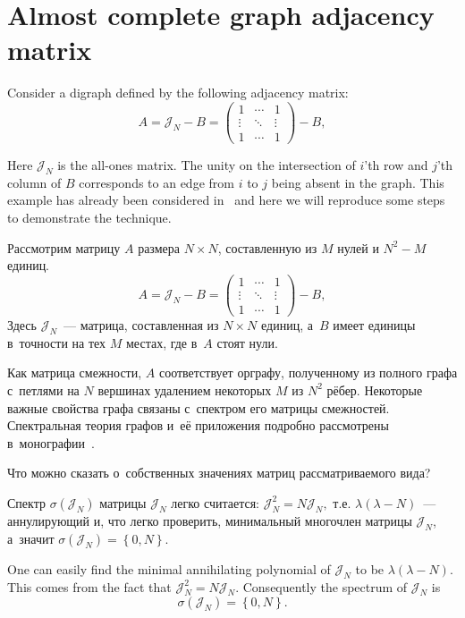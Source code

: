 \documentclass[14pt,a4paper]{extarticle}
\theoremstyle{definition}
\begin{document}
\section{Almost complete graph adjacency matrix}
\sloppy
Consider a digraph defined by the following adjacency matrix:
\[
    A = \mathcal{J}_N - B = \begin{pmatrix}1 & \cdots & 1 \\ \vdots & \ddots & \vdots \\ 1 & \cdots & 1\end{pmatrix} - B,
\]

Here \( \mathcal{J}_N \) is the all-ones matrix.
The unity on the intersection
of \( i \)'th row and \( j \)'th column of \( B \)
corresponds to an edge from \( i \) to \( j \)
being absent in the graph.
This example has already been considered in~\cite{sergekozlukov@volgograd}
and here we will reproduce some steps to demonstrate the technique.

Рассмотрим матрицу \( A \) размера \( N\times N \),
 составленную из \( M \) нулей и \( N^2 - M \) единиц.
\[
    A = \mathcal{J}_N - B = \begin{pmatrix}1 & \cdots & 1 \\ \vdots & \ddots & \vdots \\ 1 & \cdots & 1\end{pmatrix} - B,
\]
Здесь \( \mathcal{J}_N \)~--- матрица, составленная из \( N\times N \) единиц,
 а~\( B \) имеет единицы в~точности на тех \( M \) местах,
 где в~\( A \) стоят нули.

Как матрица смежности, \( A \) соответствует орграфу,
 полученному из полного графа с~петлями на \( N \) вершинах
 удалением некоторых \( M \) из \( N^2 \) р\"ебер.
Некоторые важные свойства графа связаны с~спектром его матрицы смежностей.
Спектральная теория графов и~е\"е приложения подробно рассмотрены
в~монографии~\cite{cvetkovic1997eigenspaces,cvetkovic1980spectra,cvetkovic2010introduction,godsil2013algebraic}.

Что можно сказать о~собственных значениях матриц рассматриваемого вида?

Спектр \( \sigma\left( \mathcal{J}_N \right) \)
 матрицы \( \mathcal{J}_N \) легко считается:
 \( \mathcal{J}_N^2 = N \mathcal{J}_N, \) т.е.
 \( \lambda(\lambda - N) \)~--- аннулирующий и, что легко проверить,
 минимальный многочлен матрицы \( \mathcal{J}_N \), а~значит
 \( \sigma\left( \mathcal{J}_N \right) = \left\{ 0,N \right\}. \)

One can easily find the minimal annihilating polynomial of \( \mathcal{J}_N \)
    to be \( \lambda(\lambda - N) \).
This comes from the fact that \( \mathcal{J}_N^2 = N \mathcal{J}_N \).
Consequently the spectrum of \( \mathcal{J}_N \) is
\[
    \sigma(\mathcal{J}_N) = \left\{0, N\right\}.
\]
\end{document}
